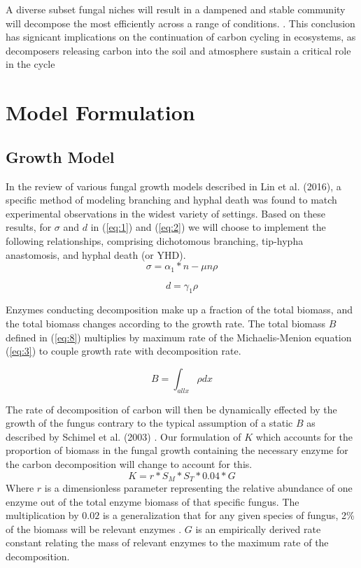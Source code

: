 \documentclass[12pt]{article}
\begin{document}
\begin{multicols}{2}
A diverse subset fungal niches will result in a dampened and stable community will decompose the most efficiently across a range of conditions. \cite{Toljander2006}. This conclusion has signicant implications on the continuation of carbon cycling in ecosystems, as decomposers releasing carbon into the soil and atmosphere sustain a critical role in the cycle \cite{Lustenhouwer2020}

\section{Model Formulation}


\subsection{Growth Model}
In the review of various fungal growth models described in Lin et al. (2016), a specific method of modeling branching and hyphal death was found to match experimental observations in the widest variety of settings. Based on these results, for $\sigma$ and $d$ in (\ref{eq:1}) and (\ref{eq:2}) we will choose to implement the following relationships, comprising dichotomous branching, tip-hypha anastomosis, and hyphal death (or YHD). 
\begin{equation} 
\sigma = \alpha_{1}*n - \mu n \rho
\end{equation}

\begin{equation}
d = \gamma_{1}\rho
\end{equation}

Enzymes conducting decomposition make up a fraction of the total biomass, and the total biomass changes according to the growth rate. The total biomass $B$ defined in (\ref{eq:8}) multiplies by maximum rate of the Michaelis-Menion equation (\ref{eq:3}) to couple growth rate with decomposition rate. 

\begin{equation} \label {eq:8}
B = \int_{all x}\rho dx
\end{equation}

The rate of decomposition of carbon will then be dynamically effected by the growth of the fungus contrary to the typical assumption of a static $B$ as described by Schimel et al. (2003) \cite{Schimel2003}. Our formulation of $K$ which accounts for the proportion of biomass in the fungal growth containing the necessary enzyme for the carbon decomposition will change to account for this. 
\begin{equation} \label {eq}
K = r*S_{M}*S_{T}*0.04*G
\end{equation}
Where $r$ is a dimensionless parameter representing the relative abundance of one enzyme out of the total enzyme biomass of that specific fungus. The multiplication by $0.02$ is a generalization that for any given species of fungus, 2\% of the biomass will be relevant enzymes \cite{Moorhead2006}. $G$ is an empirically derived rate constant relating the mass of relevant enzymes to the maximum rate of the decomposition.


\end{multicols}
\end{document}
